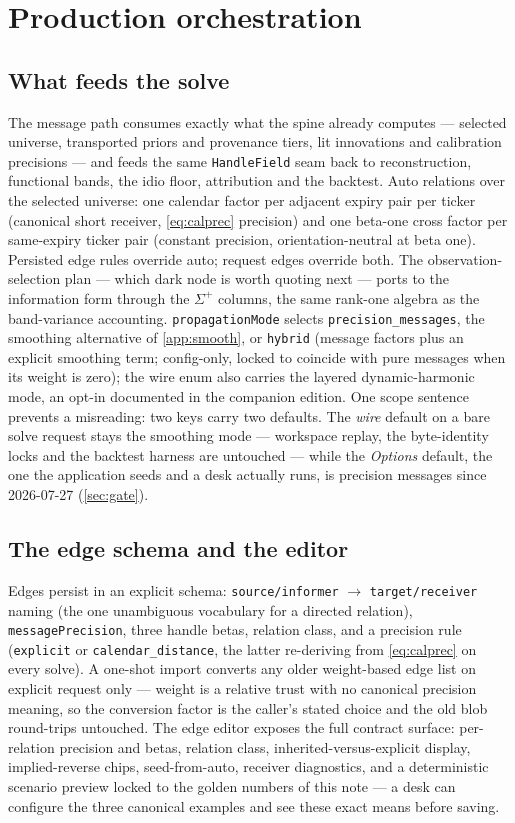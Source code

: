 \documentclass[11pt]{article}
\begin{document}
\section{Production orchestration}
\label{sec:orchestration}

\subsection{What feeds the solve}

The message path consumes exactly what the spine already computes ---
selected universe, transported priors and provenance tiers, lit
innovations and calibration precisions --- and feeds the same
\texttt{HandleField} seam back to reconstruction, functional bands, the
idio floor, attribution and the backtest.  Auto relations over the
selected universe: one calendar factor per adjacent expiry pair per
ticker (canonical short receiver, \eqref{eq:calprec} precision) and one
beta-one cross factor per same-expiry ticker pair (constant precision,
orientation-neutral at beta one).  Persisted edge rules override auto;
request edges override both.  The observation-selection plan --- which
dark node is worth quoting next --- ports to the information form
through the $\Sigma^+$ columns, the same rank-one algebra as the
band-variance accounting.  \texttt{propagationMode} selects
\texttt{precision\_messages}, the smoothing alternative of
\cref{app:smooth}, or \texttt{hybrid} (message factors plus an
explicit smoothing term; config-only, locked to coincide with pure
messages when its weight is zero); the wire enum also carries the
layered dynamic-harmonic mode, an opt-in documented in the companion
edition.  One scope sentence prevents a misreading: two keys carry two
defaults.  The \emph{wire} default on a bare solve request stays the
smoothing mode --- workspace replay, the byte-identity locks and the
backtest harness are untouched --- while the \emph{Options} default,
the one the application seeds and a desk actually runs, is precision
messages since 2026-07-27 (\cref{sec:gate}).

\subsection{The edge schema and the editor}

Edges persist in an explicit schema: \texttt{source/informer} $\to$
\texttt{target/receiver} naming (the one unambiguous vocabulary for a
directed relation), \texttt{messagePrecision}, three handle betas,
relation class, and a precision rule (\texttt{explicit} or
\texttt{calendar\_distance}, the latter re-deriving from
\eqref{eq:calprec} on every solve).  A one-shot import converts any
older weight-based edge list on explicit request only --- weight is a
relative trust with no canonical precision meaning, so the conversion
factor is the caller's stated choice and the old blob round-trips
untouched.  The edge editor exposes the full contract surface:
per-relation precision and betas, relation class,
inherited-versus-explicit display, implied-reverse chips,
seed-from-auto, receiver diagnostics, and a deterministic scenario
preview locked to the golden numbers of this note --- a desk can
configure the three canonical examples and see these exact means
before saving.
\end{document}
